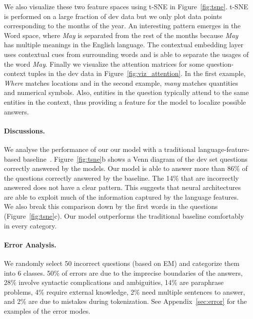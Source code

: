 We also visualize these two feature spaces using t-SNE in Figure~\ref{fig:tsne}. t-SNE is performed on a large fraction of dev data but we only plot data points corresponding to the months of the year. 
An interesting pattern emerges in the Word space, where \textit{May} is separated from the rest of the months because \textit{May} has multiple meanings in the English language. 
The contextual embedding layer uses contextual cues from surrounding words and is able to separate the usages of the word \textit{May}. Finally we visualize the attention matrices for some question-context tuples in the dev data in Figure~\ref{fig:viz_attention}. In the first example, \textit{Where} matches locations and in the second example, \textit{many} matches quantities and numerical symbols. Also, entities in the question typically attend to the same entities in the context, thus providing a feature for the model to localize possible answers.



\paragraph{Discussions.} We analyse the performance of our our model with a traditional language-feature-based baseline~\citep{rajpurkar2016squad}. Figure~\ref{fig:tsne}b shows a Venn diagram of the dev set questions correctly answered by the models. Our model is able to answer more than 86\% of the questions correctly answered by the baseline. The 14\% that are incorrectly answered does not have a clear pattern. 
This suggests that neural architectures are able to exploit much of the information captured by the language features. 
We also break this comparison down by the first words in the questions (Figure~\ref{fig:tsne}c). Our model outperforms the traditional baseline comfortably in every category.

\paragraph{Error Analysis.} We randomly select 50 incorrect questions (based on EM) and categorize them into 6 classes.
50\% of errors are due to the imprecise boundaries of the answers,
28\% involve syntactic complications and ambiguities,
14\% are paraphrase problems,
4\% require external knowledge,
2\% need multiple sentences to answer,
and 2\% are due to mistakes during tokenization.
See Appendix~\ref{sec:error} for the examples of the error modes.